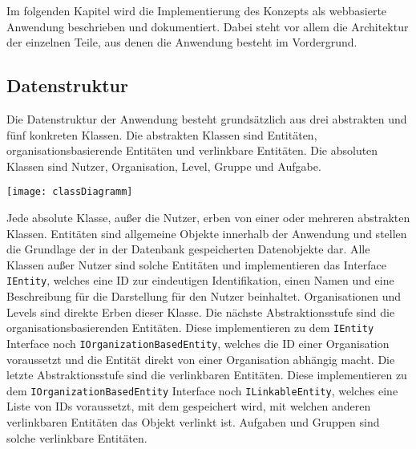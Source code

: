 Im folgenden Kapitel wird die Implementierung des Konzepts als webbasierte Anwendung beschrieben und dokumentiert.
Dabei steht vor allem die Architektur der einzelnen Teile, aus denen die Anwendung besteht im Vordergrund.

\subsection{Datenstruktur}
Die Datenstruktur der Anwendung besteht grundsätzlich aus drei abstrakten und fünf konkreten Klassen. Die abstrakten Klassen sind Entitäten, organisationsbasierende Entitäten und verlinkbare Entitäten. Die absoluten Klassen sind Nutzer, Organisation, Level, Gruppe und Aufgabe.

\vspace{20pt}
\begin{center}
    \begin{minipage}{1\linewidth}
        \texttt{[image: classDiagramm]}
    \end{minipage}
\end{center}
\vspace{20pt}

Jede absolute Klasse, außer die Nutzer, erben von einer oder mehreren abstrakten Klassen. Entitäten sind allgemeine Objekte innerhalb der Anwendung und stellen die Grundlage der in der Datenbank gespeicherten Datenobjekte dar. Alle Klassen außer Nutzer sind solche Entitäten und implementieren das Interface \verb|IEntity|, welches eine ID zur eindeutigen Identifikation, einen Namen und eine Beschreibung für die Darstellung für den Nutzer beinhaltet. Organisationen und Levels sind direkte Erben dieser Klasse. Die nächste Abstraktionsstufe sind die organisationsbasierenden Entitäten. Diese implementieren zu dem \verb|IEntity| Interface noch \verb|IOrganizationBasedEntity|, welches die ID einer Organisation voraussetzt und die Entität direkt von einer Organisation abhängig macht. Die letzte Abstraktionsstufe sind die verlinkbaren Entitäten. Diese implementieren zu dem \verb|IOrganizationBasedEntity| Interface noch \verb|ILinkableEntity|, welches eine Liste von IDs voraussetzt, mit dem gespeichert wird, mit welchen anderen verlinkbaren Entitäten das Objekt verlinkt ist. Aufgaben und Gruppen sind solche verlinkbare Entitäten.


